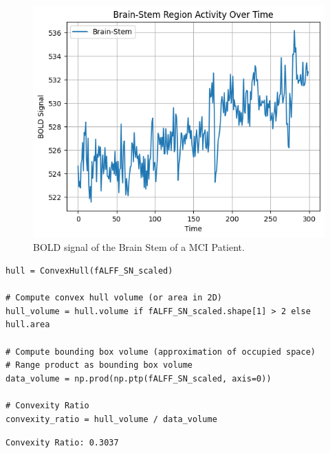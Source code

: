 \documentclass[12pt]{article}
\begin{document}
\begin{figure}[h]  %
    \centering
    \includegraphics[width=\textwidth]{"../img/BOLD.png"}  %
    \caption{BOLD signal of the Brain Stem of a MCI Patient.}
    \label{fig:BOLD}  %
\end{figure}

\FloatBarrier  %


\begin{center}
    \begin{lstlisting}[caption={Convex Hull Ration Calculation}, label={lst:convex_hull_code}]
hull = ConvexHull(fALFF_SN_scaled)

# Compute convex hull volume (or area in 2D)
hull_volume = hull.volume if fALFF_SN_scaled.shape[1] > 2 else hull.area

# Compute bounding box volume (approximation of occupied space)
# Range product as bounding box volume
data_volume = np.prod(np.ptp(fALFF_SN_scaled, axis=0))

# Convexity Ratio
convexity_ratio = hull_volume / data_volume
\end{lstlisting}
\texttt{Convexity Ratio: 0.3037}
\end{center}


\FloatBarrier

\end{document}
